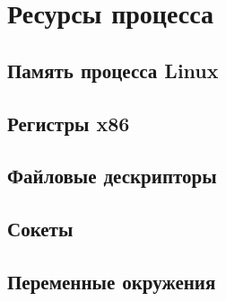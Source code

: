\section{Ресурсы процесса}

\subsection{Память процесса Linux}

\subsection{Регистры x86}

\subsection{Файловые дескрипторы}

\subsection{Сокеты}

\subsection{Переменные окружения}
